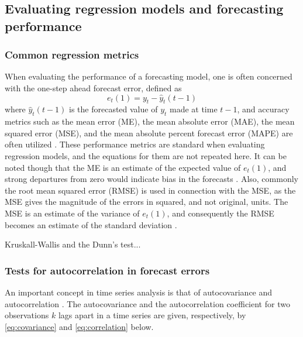 

 
\subsection{Evaluating regression models and forecasting performance}
\label{sec:reg_metrics}
\subsubsection{Common regression metrics}
When evaluating the performance of a forecasting model, one is often concerned with the one-step ahead forecast error, defined as
$$e_t(1) = y_t - \hat{y}_t (t-1)$$ 
where $\hat{y}_t (t-1)$ is the forecasted value of $y_t$ made at time $t-1$, and accuracy metrics such as the mean error (ME), the mean absolute error (MAE), the mean squared error (MSE), and the mean absolute percent forecast error (MAPE) are often utilized \cite{Montgomery2015}. These performance metrics are standard when evaluating regression models, and the equations for them are not repeated here. It can be noted though that the ME is an estimate of the expected value of $e_t(1)$, and strong departures from zero would indicate bias in the forecasts \cite{Montgomery2015}. Also, commonly the root mean squared error (RMSE) is used in connection with the MSE, as the MSE gives the magnitude of the errors in squared, and not original, units. The MSE is an estimate of the variance of $e_t(1)$, and consequently the RMSE becomes an estimate of the standard deviation \cite{Montgomery2012}. 

Kruskall-Wallis and the Dunn's test...

\subsubsection{Tests for autocorrelation in forecast errors}
\label{sec:auto_errors}
An important concept in time series analysis is that of autocovariance and autocorrelation \cite{Montgomery2015}. The autocovariance and  the autocorrelation coefficient for two observations $k$ lags apart in a time series are given, respectively, by \cref{eq:covariance} and \cref{eq:correlation} below.  

